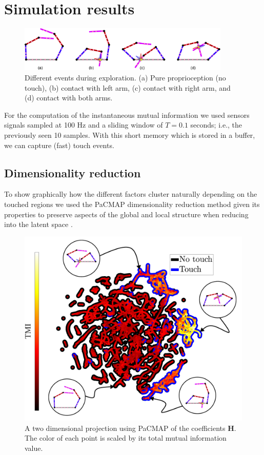 \section{Simulation results}
\begin{figure}[!ht]
	\centering
	\includegraphics[width=0.9\textwidth]{planar_dual_arm_modes.pdf}
	\caption{Different events during exploration. (a) Pure proprioception (no touch), (b) contact with left arm, (c) contact with right arm, and (d) contact with both arms.}
	\label{fig:planar_dual_arm_modes}
\end{figure}
For the computation of the instantaneous mutual information we used sensors signals sampled at 100 Hz and a sliding window of $T = 0.1$ seconds; i.e., the previously seen 10 samples. With this short memory which is stored in a buffer, we can capture (fast) touch events.

\subsection{Dimensionality reduction}
To show graphically how the different factors cluster naturally depending on the touched regions we used the PaCMAP dimensionality reduction method \cite{Wang2021Understandinghowdimension} given its properties to preserve aspects of the global and local structure when reducing into the latent space \cite{Huang2022Towardscomprehensiveevaluation}.

\begin{figure}[!th]
	\centering
	\includegraphics[width=0.99\columnwidth]{fig/pacmac_with_timi_and_modes.pdf}
	\caption{A two dimensional projection using PaCMAP of the coefficients $\bm{H}$. The color of each point is scaled by its total mutual information value.}
	\label{fig:pacmac_with_timi_and_modes}
\end{figure}

